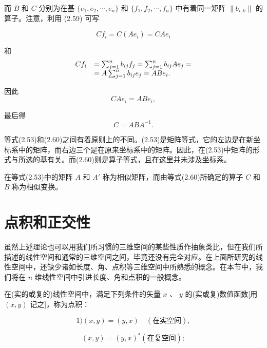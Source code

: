 而 $B$ 和 $C$ 分别为在基 $\{e_{1}, e_{2}, \cdots, e_{n}\}$ 和 $\{f_{1}, f_{2}, \cdots, f_{n}\}$ 中有着同一矩阵 $\|b_{i,k}\|$ 的算子。注意，利用 (2.59) 可写

\begin{equation*}
C f _ {i} = C (A e _ {i}) = C A e _ {i}
\end{equation*}

和
\begin{equation*}
\begin{array}{r l} C f _ {i} & = \sum_ {j = 1} ^ {n} b _ {i j} f _ {j} = \sum_ {j = 1} ^ {n} b _ {i j} A e _ {j} = \\ & = A \sum_ {j = 1} ^ {n} b _ {i j} e _ {j} = A B e _ {i}. \end{array}
\end{equation*}

因此
\begin{equation*}
C A e _ {i} = A B e _ {i},
\end{equation*}

最后得
\begin{equation*}
C = A B A ^ {- 1}.\tag{2.60}
\end{equation*}

等式(2.53)和(2.60)之间有着原则上的不同。(2.53)是矩阵等式，它的左边是在新坐标系中的矩阵，而右边三个是在原来坐标系中的矩阵。因此，在(2.53)中矩阵的形式与所选的基有关。而(2.60)则是算子等式，且在这里并未涉及坐标系。

在等式(2.53)中的矩阵 $A$ 和 $A'$ 称为相似矩阵，而由等式(2.60)所确定的算子 $C$ 和 $B$ 称为相似变换。

\section{点积和正交性}

虽然上述理论也可以用我们所习惯的三维空间的某些性质作抽象类比，但在我们所描述的线性空间和通常的三维空间之间，毕竟还没有完全对应。在上面所研究的线性空间中，还缺少诸如长度、角、点积等三维空间中所熟悉的概念。在本节中，我们将在 $n$ 维线性空间中引进长度、角和点积的一般概念。

在(实的或复的)线性空间中，满足下列条件的矢量 $x$ 、 $y$ 的(实或复)数值函数[用 $(x, y)$ 记之]，称为点积：

\begin{equation*}
1) (x, y) = (y, x) \quad (\text {在实空间}),\tag{2.61}
\end{equation*}

\begin{equation*}
(x, y) = (y, x) ^ {*} (\text {在复空间});
\end{equation*}

